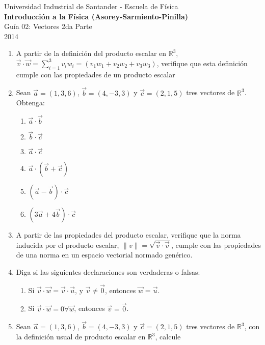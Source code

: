 \documentclass[a4paper,12pt]{article}
\begin{document}
\begin{center}
  {\small{Universidad Industrial de Santander - Escuela de Física}}\\
  {\bf{Introducción a la Física (Asorey-Sarmiento-Pinilla)}}\\
  \vspace{0.4cm}
  Guía 02: Vectores 2da Parte\\ 2014
\end{center}

\renewcommand{\labelenumi}{\arabic{enumi})}
\renewcommand{\labelenumii}{\arabic{enumii})}

\begin{enumerate}
  \item A partir de la definición del producto escalar en $\mathbb R^3$, $\vec v \cdot \vec w = \sum_{i=1}^3 v_i w_i =(v_1 w_1 + v_2 w_2 + v_3 w_3)$, verifique que esta definición cumple con las propiedades de un producto escalar
  \item Sean $\vec a=(1,3,6)$,  $\vec b=(4,-3,3)$ y $\vec c=(2,1,5)$  tres vectores de $\mathbb{R}^3$. Obtenga:
    \begin{enumerate}
      \item $\vec a \cdot \vec b$
      \item $\vec b \cdot \vec c$
      \item $\vec a \cdot \vec c$
      \item $\vec a \cdot \left ( \vec b + \vec c\right )$
      \item $\left( \vec a - \vec b\right ) \cdot \vec c$
      \item $\left( 3 \vec a + 4 \vec b\right ) \cdot \vec c$
    \end{enumerate}
  \item A partir de las propiedades del producto escalar, verifique que la norma inducida por el producto escalar, $ \| v \|= \sqrt{\vec v \cdot \vec v}$, cumple con las propiedades de una norma en un espacio vectorial normado genérico.
  \item Diga si las siguientes declaraciones son verdaderas o falsas: 
    \begin{enumerate}
      \item Si $\vec v \cdot \vec w = \vec v \cdot \vec u$, y $\vec v \neq \vec 0$, entonces $\vec w = \vec u$.
      \item Si $\vec v \cdot \vec w = 0 \forall \vec w$, entonces $\vec v = \vec 0$. 
    \end{enumerate}
  \item Sean $\vec a=(1,3,6)$,  $\vec b=(4,-3,3)$ y $\vec c=(2,1,5)$ tres vectores de $\mathbb{R}^3$, con la definición usual de producto escalar en $\mathbb{R}^3$, calcule

\end{enumerate}
\end{document}
